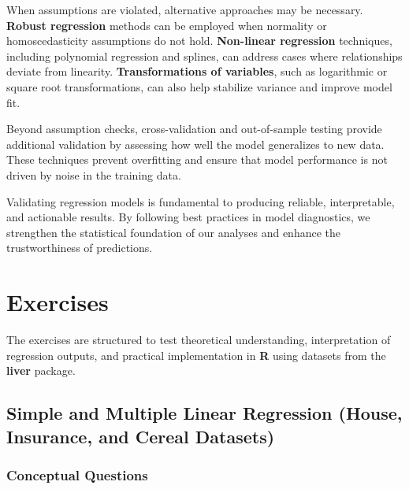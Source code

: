 \documentclass[
  11pt,
]{book}
\theoremstyle{definition}
\theoremstyle{definition}
\theoremstyle{definition}
\theoremstyle{definition}
\theoremstyle{remark}
\begin{document}
When assumptions are violated, alternative approaches may be necessary. \textbf{Robust regression} methods can be employed when normality or homoscedasticity assumptions do not hold. \textbf{Non-linear regression} techniques, including polynomial regression and splines, can address cases where relationships deviate from linearity. \textbf{Transformations of variables}, such as logarithmic or square root transformations, can also help stabilize variance and improve model fit.

Beyond assumption checks, cross-validation and out-of-sample testing provide additional validation by assessing how well the model generalizes to new data. These techniques prevent overfitting and ensure that model performance is not driven by noise in the training data.

Validating regression models is fundamental to producing reliable, interpretable, and actionable results. By following best practices in model diagnostics, we strengthen the statistical foundation of our analyses and enhance the trustworthiness of predictions.

\section{Exercises}\label{regression-exercises}

The exercises are structured to test theoretical understanding, interpretation of regression outputs, and practical implementation in \textbf{R} using datasets from the \textbf{liver} package.

\subsection*{Simple and Multiple Linear Regression (House, Insurance, and Cereal Datasets)}\label{simple-and-multiple-linear-regression-house-insurance-and-cereal-datasets}


\subsubsection*{Conceptual Questions}\label{conceptual-questions-6}
\end{document}
